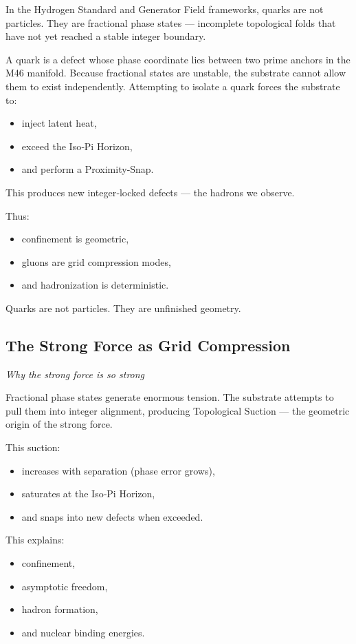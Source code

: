 \documentclass[reprint,amsmath,amssymb,aps,prl,floatfix]{revtex4-2}
\begin{document}
\begin{itemize}
In the Hydrogen Standard and Generator Field frameworks, quarks are not particles.  
They are fractional phase states — incomplete topological folds that have not yet reached a stable integer boundary.
\medskip

A quark is a defect whose phase coordinate lies between two prime anchors in the M46 manifold.  
Because fractional states are unstable, the substrate cannot allow them to exist independently. Attempting to isolate a quark forces the substrate to:
\begin{itemize}
\item inject latent heat,  
\item exceed the Iso‑Pi Horizon,  
\item and perform a Proximity‑Snap.
\end{itemize}
\medskip

This produces new integer‑locked defects — the hadrons we observe.
\medskip

Thus:
\begin{itemize}
\item confinement is geometric,  
\item gluons are grid compression modes,  
\item and hadronization is deterministic.
\end{itemize}
\medskip

Quarks are not particles.  
They are unfinished geometry.

\subsection{The Strong Force as Grid Compression}
\textit{Why the strong force is so strong}

Fractional phase states generate enormous tension.  
The substrate attempts to pull them into integer alignment, producing Topological Suction — the geometric origin of the strong force.
\medskip

This suction:
\begin{itemize}
\item increases with separation (phase error grows),  
\item saturates at the Iso‑Pi Horizon,  
\item and snaps into new defects when exceeded.
\end{itemize}
\medskip

This explains:
\begin{itemize}
\item confinement,  
\item asymptotic freedom,  
\item hadron formation,  
\item and nuclear binding energies.
\end{itemize}
\medskip


\end{itemize}
\end{document}
